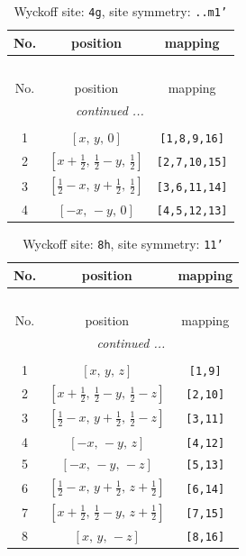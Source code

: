 \documentclass[fleqn,8pt]{jsarticle}
\begin{document}
\renewcommand{\arraystretch}{1.2}
\begin{longtable}{ccc}
\caption{Wyckoff site: {\tt 4g}, site symmetry: {\tt ..m1'}}
 \\
 \hline \hline
No. & position & mapping \\ \hline \endfirsthead

\multicolumn{2}{l}{\tablename\ \thetable{}} \\
 \hline \hline
No. & position & mapping \\ \hline \endhead

 \hline \hline
\multicolumn{2}{r}{\footnotesize\it continued ...} \\ \endfoot

 \hline \hline
\multicolumn{2}{r}{} \\ \endlastfoot

1 & $\left[ x,\, y,\, 0 \right]$ & {\tt [1,8,9,16]} \\ \hline
2 & $\left[ x + \frac{1}{2},\, \frac{1}{2} - y,\, \frac{1}{2} \right]$ & {\tt [2,7,10,15]} \\ \hline
3 & $\left[ \frac{1}{2} - x,\, y + \frac{1}{2},\, \frac{1}{2} \right]$ & {\tt [3,6,11,14]} \\ \hline
4 & $\left[ - x,\, - y,\, 0 \right]$ & {\tt [4,5,12,13]} \\
\end{longtable}
\renewcommand{\arraystretch}{1.2}
\begin{longtable}{ccc}
\caption{Wyckoff site: {\tt 8h}, site symmetry: {\tt 11'}}
 \\
 \hline \hline
No. & position & mapping \\ \hline \endfirsthead

\multicolumn{2}{l}{\tablename\ \thetable{}} \\
 \hline \hline
No. & position & mapping \\ \hline \endhead

 \hline \hline
\multicolumn{2}{r}{\footnotesize\it continued ...} \\ \endfoot

 \hline \hline
\multicolumn{2}{r}{} \\ \endlastfoot

1 & $\left[ x,\, y,\, z \right]$ & {\tt [1,9]} \\ \hline
2 & $\left[ x + \frac{1}{2},\, \frac{1}{2} - y,\, \frac{1}{2} - z \right]$ & {\tt [2,10]} \\ \hline
3 & $\left[ \frac{1}{2} - x,\, y + \frac{1}{2},\, \frac{1}{2} - z \right]$ & {\tt [3,11]} \\ \hline
4 & $\left[ - x,\, - y,\, z \right]$ & {\tt [4,12]} \\ \hline
5 & $\left[ - x,\, - y,\, - z \right]$ & {\tt [5,13]} \\ \hline
6 & $\left[ \frac{1}{2} - x,\, y + \frac{1}{2},\, z + \frac{1}{2} \right]$ & {\tt [6,14]} \\ \hline
7 & $\left[ x + \frac{1}{2},\, \frac{1}{2} - y,\, z + \frac{1}{2} \right]$ & {\tt [7,15]} \\ \hline
8 & $\left[ x,\, y,\, - z \right]$ & {\tt [8,16]} \\
\end{longtable}
\end{document}
